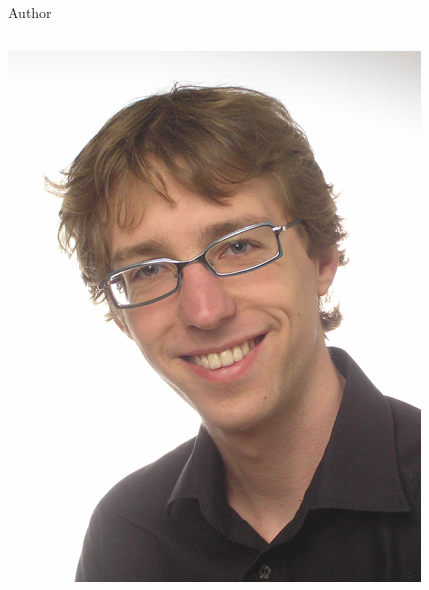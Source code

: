 \begin{frame}{Author}
\begin{columns}[T]
\begin{column}{0.25\linewidth}
			\includegraphics[width=\linewidth]{figures/psommer.jpg}
		\end{column}
	\end{columns}
\end{frame}

